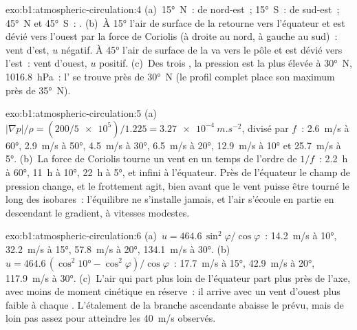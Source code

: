 \begin{solution}{exo:b1:atmospheric-circulation:4}
(a)~\ang{15}~N~:  de nord-est~; \ang{15}~S~:  de sud-est~;
\ang{45}~N et \ang{45}~S~: . (b)~À \ang{15} l'air de surface de la 
retourne vers l'équateur et est dévié vers l'ouest par la force de Coriolis
(à droite au nord, à gauche au sud)~: vent d'est, $u$ négatif. À \ang{45} l'air de
surface de la  va vers le pôle et est dévié vers l'est~: vent d'ouest,
$u$ positif. (c)~Des trois , la pression est la plus élevée à \ang{30}~N,
\qty{1016.8}{hPa}~: l' se trouve près de \ang{30}~N (le profil complet place
son maximum près de \ang{35}~N).
\end{solution}

\begin{solution}{exo:b1:atmospheric-circulation:5}
(a)~$|\nabla p|/\rho = (200/\num{5e5})/1.225 = \qty{3.27e-4}{m.s^{-2}}$, divisé par
$f$~: \qty{2.6}{m/s} à \ang{60}, \qty{2.9}{m/s} à \ang{50}, \qty{4.5}{m/s} à
\ang{30}, \qty{6.5}{m/s} à \ang{20}, \qty{12.9}{m/s} à \ang{10} et
\qty{25.7}{m/s} à \ang{5}. (b)~La force de Coriolis tourne un vent en un temps de l'ordre de
$1/f$~: \qty{2.2}{h} à \ang{60}, \qty{11}{h} à \ang{10}, \qty{22}{h} à \ang{5}, et
infini à l'équateur. Près de l'équateur le champ de pression change, et le
frottement agit, bien avant que le vent puisse être tourné le long des isobares~: l'équilibre
ne s'installe jamais, et l'air s'écoule en partie en descendant le gradient, à vitesses modestes.
\end{solution}

\begin{solution}{exo:b1:atmospheric-circulation:6}
(a)~$u = 464.6\,\sin^2\varphi/\cos\varphi$~: \qty{14.2}{m/s} à \ang{10},
\qty{32.2}{m/s} à \ang{15}, \qty{57.8}{m/s} à \ang{20}, \qty{134.1}{m/s} à
\ang{30}. (b)~$u = 464.6\,(\cos^2\ang{10} - \cos^2\varphi)/\cos\varphi$~:
\qty{17.7}{m/s} à \ang{15}, \qty{42.9}{m/s} à \ang{20}, \qty{117.9}{m/s} à
\ang{30}. (c)~L'air qui part plus loin de l'équateur part plus près de l'axe,
avec moins de moment cinétique en réserve~: il arrive avec un vent d'ouest plus faible à chaque
. L'étalement de la branche ascendante abaisse le  prévu, mais de loin pas
assez pour atteindre les \qty{40}{m/s} observés.
\end{solution}

